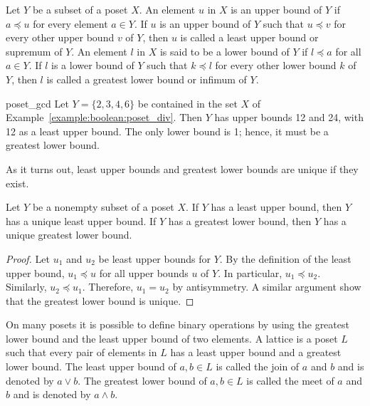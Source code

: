 Let $Y$ be a subset of a poset $X$. An element $u$ in $X$ is an {\bfi upper bound\/} of $Y$ if $a \preceq u$ for every element $a \in Y$. If $u$ is an upper bound of $Y$ such that $u \preceq v$ for every other upper bound $v$ of $Y$, then $u$ is called a {\bfi least upper bound\/} or {\bfi supremum\/} of $Y$. An element $l$ in $X$ is said to be a {\bfi lower bound\/} of $Y$ if $l \preceq a$ for all $a \in Y$. If $l$ is a lower bound of $Y$ such that $k \preceq l$ for every other lower bound $k$ of $Y$, then $l$ is called a {\bfi greatest lower bound\/} or {\bfi infimum\/} of $Y$.


\begin{example}{poset_gcd}
Let $Y = \{  2, 3, 4, 6 \}$ be contained in the set $X$ of Example~\ref{example:boolean:poset_div}.  Then $Y$ has upper bounds 12 and 24, with 12 as a least upper bound.  The only lower bound is 1; hence, it must be a greatest lower bound.
\end{example}


As it turns out, least upper bounds and greatest lower bounds are unique if they exist.

\begin{theorem}
Let $Y$ be a nonempty subset of a poset $X$. If $Y$ has a least upper bound, then $Y$ has a unique least upper bound. If $Y$ has a greatest lower bound, then $Y$ has a unique greatest lower bound.
\end{theorem} 

\begin{proof}
Let $u_1$ and $u_2$ be least upper bounds for $Y$. By the definition
of the least upper bound, $u_1 \preceq u$ for all upper bounds $u$ of
$Y$. In particular, $u_1 \preceq u_2$. Similarly, $u_2 \preceq u_1$.
Therefore, $u_1 = u_2$ by antisymmetry.  A similar argument show that
the greatest lower bound is unique.
\end{proof}
 
\medskip
 
On many posets it is possible to define binary operations
by using the greatest lower bound and the least upper bound of two
elements. A {\bfi lattice\/} is a poset $L$
such that every pair of elements in $L$ has a least upper bound and a
greatest lower bound. The least upper bound of $a, b \in L$ is called
the {\bfi join\/}\label{join} of $a$ and $b$ and is denoted 
by $a \vee b$.  The greatest lower bound of $a, b \in L$ is called 
the {\bfi meet\/}\label{meet} of $a$ and $b$ and is denoted 
by $a \wedge b$.
 
